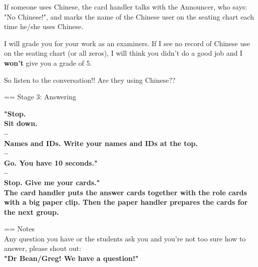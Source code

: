 \documentclass[a4paper]{article}
\begin{document}
\begin{textblock}{14}
\begin{description}
%

If someone uses Chinese, the card handler
talks with the Announcer, who says: "No Chinese!", and marks
the name of the Chinese user on the seating chart each time he/she uses Chinese.

I will grade you for your work as an examiners. If I see no record of Chinese use on the seating chart (or all zeros), I will think you didn't do a good job and I \textbf{won't} give you a grade of 5.

So listen to the conversation!! Are they using Chinese??

\end{description}

\Huge == Stage 3: Answering\\

\begin{description}

\large \mdseries
\item [Announcer]
\Large \bfseries
	"Stop.\\
	Sit down.\\
	--\\
	Names and IDs. Write your names and IDs at the top.\\
	--\\
	Go. You have 10 seconds."\\
	--\\
	Stop. Give me your cards."\\

\large \mdseries
The card handler puts the answer cards together with the role cards with a big paper clip. Then the paper handler prepares the cards for the next group.

\end{description}

\Huge == Notes\\

\large \mdseries
Any question you have or the students ask you and you're not too sure how to answer, please shout out:\\
\Huge \bfseries
	"Dr Bean/Greg! We have a question!"

\end{textblock}

\end{document}
